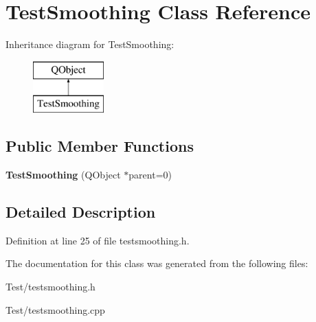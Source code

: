 \hypertarget{class_test_smoothing}{}\section{Test\+Smoothing Class Reference}
\label{class_test_smoothing}
Inheritance diagram for Test\+Smoothing\+:\begin{figure}[H]
\begin{center}
\leavevmode
\includegraphics[height=2.000000cm]{class_test_smoothing}
\end{center}
\end{figure}
\subsection*{Public Member Functions}
\begin{DoxyCompactItemize}
\item 
{\bfseries Test\+Smoothing} (Q\+Object $\ast$parent=0)\hypertarget{class_test_smoothing_a60226c5e0e8e559c7a3516fef3c7b66e}{}\label{class_test_smoothing_a60226c5e0e8e559c7a3516fef3c7b66e}

\end{DoxyCompactItemize}


\subsection{Detailed Description}


Definition at line 25 of file testsmoothing.\+h.



The documentation for this class was generated from the following files\+:\begin{DoxyCompactItemize}
\item 
Test/testsmoothing.\+h\item 
Test/testsmoothing.\+cpp\end{DoxyCompactItemize}
